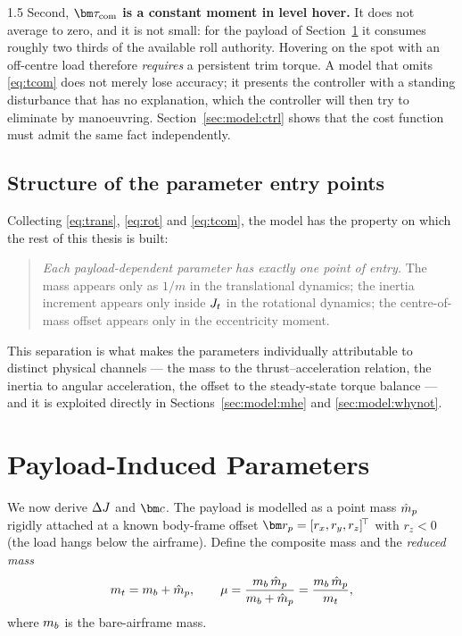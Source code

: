 \begin{spacing}{1.5}
Second, \textbf{$\tcom$ is a constant moment in level hover.} It does not
average to zero, and it is not small: for the payload of
Section~\ref{sec:model:payload} it consumes roughly two thirds of the
available roll authority. Hovering on the spot with an off-centre load
therefore \emph{requires} a persistent trim torque. A model that omits
\eqref{eq:tcom} does not merely lose accuracy; it presents the controller
with a standing disturbance that has no explanation, which the controller
will then try to eliminate by manoeuvring. Section~\ref{sec:model:ctrl}
shows that the cost function must admit the same fact independently.

\subsection{Structure of the parameter entry points}\label{sec:model:entry}

Collecting \eqref{eq:trans}, \eqref{eq:rot} and \eqref{eq:tcom}, the model
has the property on which the rest of this thesis is built:

\begin{quote}
\emph{Each payload-dependent parameter has exactly one point of entry.}
The mass appears only as $1/m$ in the translational dynamics; the inertia
increment appears only inside $J_t$ in the rotational dynamics; the
centre-of-mass offset appears only in the eccentricity moment.
\end{quote}

This separation is what makes the parameters individually attributable to
distinct physical channels --- the mass to the thrust--acceleration
relation, the inertia to angular acceleration, the offset to the
steady-state torque balance --- and it is exploited directly in
Sections~\ref{sec:model:mhe} and \ref{sec:model:whynot}.

\section{Payload-Induced Parameters}\label{sec:model:payload}

We now derive $\Delta J$ and $\cvec$. The payload is modelled as a point mass
$\hat{m}_p$ rigidly attached at a known body-frame offset
$\rp = [r_x, r_y, r_z]^{\!\top}$ with $r_z < 0$ (the load hangs below the
airframe). Define the composite mass and the \emph{reduced mass}
\begin{equation}
m_t = m_b + \hat{m}_p,
\qquad
\mu = \frac{m_b\, \hat{m}_p}{m_b + \hat{m}_p} = \frac{m_b\, \hat{m}_p}{m_t},
\label{eq:mu}
\end{equation}
where $m_b$ is the bare-airframe mass.


\end{spacing}

